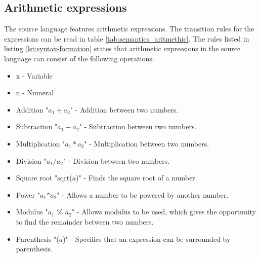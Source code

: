 \subsection{Arithmetic expressions}
The source language features arithmetic expressions. The transition rules for the expressions can be read in table \ref{tab:semantics_aritmethic}.
The rules listed in listing \ref{lst:syntax-formation} states that arithmetic expressions in the source language can consist of the following operations:
\begin{itemize}
	\item x - Variable
	\item n - Numeral
	\item Addition "$a_1 + a_2$" - Addition between two numbers.
	\item Subtraction "$a_1 - a_2$" - Subtraction between two numbers.
	\item Multiplication "$a_1 * a_2$" - Multiplication between two numbers.
	\item Division "$a_1 / a_2$" - Division between two numbers.
	\item Square root "sqrt($a$)" - Finds the square root of a number.
	\item Power "$a_1$\texttt{\^{}}$a_2$" - Allows a number to be powered by another number.
	\item Modulus "$a_1$ \% $a_2$" - Allows modulus to be used, which gives the opportunity to find the remainder between two numbers.
	\item Parenthesis "($a$)" - Specifies that an expression can be surrounded by parenthesis.
\end{itemize}

